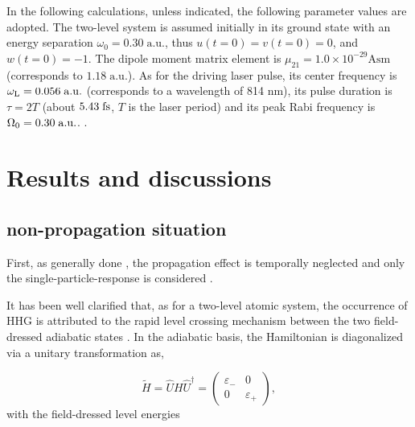 \documentclass[10pt,letterpaper]{article}
\begin{document}
In the following calculations, unless indicated, the following parameter values are adopted.
The two-level system is assumed initially in its ground state with an energy separation $\omega_0=0.30\;\textrm{a.u.}$, thus $ u(t=0)=v(t=0)=0 $, and $ w(t=0)=-1 $. The dipole moment matrix element is $\mu_{21}=1.0\times10^{-29}\textrm{Asm}$ (corresponds to $1.18\;\textrm{a.u.}$). As for the driving laser pulse, its center frequency is $ \omega_{\rm{L}}=0.056\;\rm{a.u.}$ (corresponds to a wavelength of 814 nm), its pulse duration is $\tau=2T$ (about $ 5.43\;\rm{fs} $, $T$ is the laser period) and its peak Rabi frequency is $ \Omega_{0}=0.30\;\rm{a.u.} $. \cite{Kalosha-Two-Level-PRL-1999}. 

\section{Results and discussions}

\subsection{non-propagation situation}
First, as generally done \cite{CuiNi2010NJP-wavelet,Faria-Two-Level-Three-Step-PRA-2002,Gauthey-Early-Two-Level-PRA-1997,Gong-Two-Level-Two-Color-JMO-1999,Kaplan-Early-Two-Level-PRA-1994,LiuChengpu-Two-Level-PRA-2004,YangWeifeng-Two-Level-PLA-2007,ZengZhinan-Two-Color-PRL-2007,WANG-ZHONG-YANG-Two-Level-Attosecond-generation-1999}, the propagation effect is temporally neglected and only the single-particle-response is considered . 

It has been well clarified that, as for a two-level atomic system, the occurrence of HHG is attributed to the rapid level crossing mechanism between the two field-dressed adiabatic states  \cite{Gauthey-Early-Two-Level-PRA-1997}. In the adiabatic basis, the Hamiltonian is diagonalized via a unitary transformation as,

\begin{equation}
\tilde H = \hat UH{\hat U^\dag } = \left( {\begin{array}{*{20}{c}}
	{{\varepsilon _ - }}&0\\
	0&{{\varepsilon _ + }}
	\end{array}} \right),
\label{eq12}
\end{equation}
with the field-dressed level energies \cite{YangWeifeng-Two-Level-PLA-2007}
\end{document}
